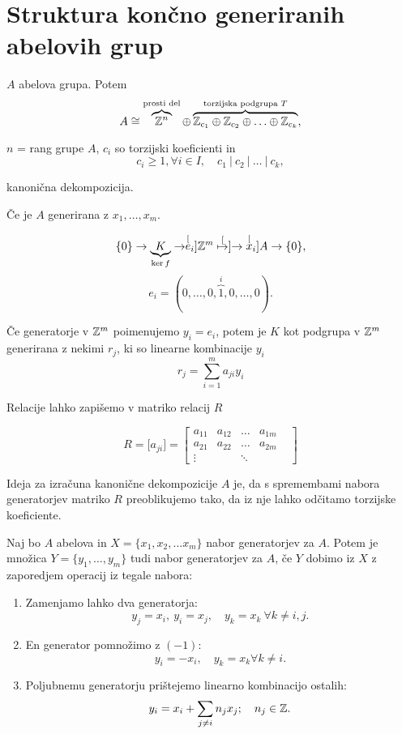 \section{Struktura kon\v cno generiranih abelovih grup}

$A$ abelova grupa. Potem
\[
	A \cong \overbrace{\mathbb{Z}^n}^\text{prosti del} \oplus \overbrace{\mathbb{Z}_{c_1} \oplus \mathbb{Z}_{c_2} \oplus \ldots \oplus \mathbb{Z}_{c_k}}^\text{torzijska podgrupa $T$},
\]

\ni $n$ = rang grupe $A$, $c_i$ so torzijski koeficienti in
\[
	c_i \geq 1, \forall i \in I, \quad c_1\ |\ c_2\ |\ \ldots\ |\ c_k,
\]

kanoni\v cna dekompozicija.

\v Ce je $A$ generirana z $x_1, \ldots, x_m$.

\[
	\{0\} \to \underbrace{K}_{\ker f} \to \stackrel[e_i]{}{ \ensuremath{\mathbb{Z}} ^m} \stackrel[\mapsto]{}{\to} \stackrel[x_i]{}{A} \to \{ 0\},
\]
\[
	e_i = (0,\ldots,0,\overbrace{1}^{i},0,\ldots,0).
\]

\ni \v Ce generatorje v $\mathbb{Z}^m$ poimenujemo $y_i = e_i$, potem je $K$ kot podgrupa v $\mathbb{Z}^m$ generirana z nekimi $r_j$, ki so linearne kombinacije $y_i$
\[
	r_j = \sum_{i = 1}^m a_{ji} y_i
\]

\ni Relacije lahko zapi\v semo v matriko relacij $R$

\[
	R = \big[a_{ji}\big] =
	\begin{bmatrix}
		a_{11} & a_{12} & \ldots & a_{1m} \\
		a_{21} & a_{22} & \ldots & a_{2m} \\
		\vdots &  & \ddots & & 
	\end{bmatrix}
\]

\ni Ideja za izra\v cuna kanoni\v cne dekompozicije $A$ je, da s spremembami nabora generatorjev matriko $R$ preoblikujemo tako,
da iz nje lahko od\v citamo torzijske koeficiente.

\begin{trditev}
	Naj bo $A$ abelova in $X = \{x_1, x_2, \ldots x_m\}$ nabor generatorjev za $A$. Potem je mno\v zica $Y = \{y_1, \ldots, y_m\}$
	tudi nabor generatorjev za $A$, \v ce $Y$ dobimo iz $X$ z zaporedjem operacij iz tegale nabora:
	\begin{enumerate}
		\item{Zamenjamo lahko dva generatorja:
			\[
				y_j = x_i,\ y_i = x_j, \quad y_k = x_k\ \forall k \neq i,j.
			\]}
		\item{En generator pomno\v zimo z $(-1)$:
			\[
				y_i = -x_i, \quad y_k = x_k \forall k \neq i.
			\]}
		\item{Poljubnemu generatorju pri\v stejemo linearno kombinacijo ostalih:
			\[
				y_i = x_i + \sum_{j \neq i} n_j x_j; \quad n_j \in \mathbb{Z}.
			\]}
	\end{enumerate}
\end{trditev}

